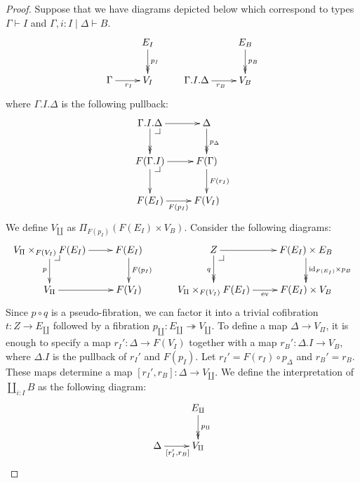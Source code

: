\documentclass[reqno]{amsart}
\makeatletter
\theoremstyle{definition}
\theoremstyle{remark}
\newcommand{\fs}[1]{\mathrm{#1}}
\newcommand{\id}{\fs{id}}
\numberwithin{figure}{section}
\newcommand{\pb}[1][dr]{\save*!/#1-1.2pc/#1:(-1,1)@^{|-}\restore}
\makeatother
\begin{document}
\begin{proof}
Suppose that we have diagrams depicted below which correspond to types $\Gamma \vdash I$ and $\Gamma, i : I \mid \Delta \vdash B$.
\[ \xymatrix{                       & E_I \ar@{->>}[d]^{p_I} \\
              \Gamma \ar[r]_{r_I}   & V_I
            } \qquad
   \xymatrix{                               & E_B \ar@{->>}[d]^{p_B} \\
              \Gamma.I.\Delta \ar[r]_{r_B}  & V_B
            } \]
where $\Gamma.I.\Delta$ is the following pullback:
\[ \xymatrix{ \Gamma.I.\Delta \ar[r] \ar@{->>}[d] \pb   & \Delta \ar@{->>}[d]^{p_\Delta} \\
              F(\Gamma.I) \ar[r] \ar[d] \pb             & F(\Gamma) \ar[d]^{F(r_I)} \\
              F(E_I) \ar[r]_{F(p_I)}                    & F(V_I)
            } \]
We define $V_\amalg$ as $\Pi_{F(p_I)}(F(E_I) \times V_B)$.
Consider the following diagrams:
\[ \xymatrix{ V_\Pi \times_{F(V_I)} F(E_I) \ar[r] \ar[d]_p \pb  & F(E_I) \ar[d]^{F(p_I)} \\
              V_\Pi \ar[r]                                      & F(V_I)
            } \qquad
   \xymatrix{ Z \ar[r] \ar@{->>}[d]_q \pb                       & F(E_I) \times E_B \ar@{->>}[d]^{\id_{F(E_I)} \times p_B} \\
              V_\Pi \times_{F(V_I)} F(E_I) \ar[r]_-{\fs{ev}}    & F(E_I) \times V_B
            } \]
Since $p \circ q$ is a pseudo-fibration, we can factor it into a trivial cofibration $t : Z \to E_\amalg$ followed by a fibration $p_\amalg : E_\amalg \twoheadrightarrow V_\amalg$.
To define a map $\Delta \to V_\Pi$, it is enough to specify a map $r_I' : \Delta \to F(V_I)$ together with a map $r_B' : \Delta.I \to V_B$, where $\Delta.I$ is the pullback of $r_I'$ and $F(p_I)$.
Let $r_I' = F(r_I) \circ p_\Delta$ and $r_B' = r_B$.
These maps determine a map $[r_I',r_B] : \Delta \to V_\amalg$.
We define the interpretation of $\coprod_{i : I} B$ as the following diagram:
\[ \xymatrix{                               & E_\amalg \ar@{->>}[d]^{p_\amalg} \\
              \Delta \ar[r]_{[r_I',r_B]}    & V_\amalg
            } \]


\end{proof}
\end{document}
